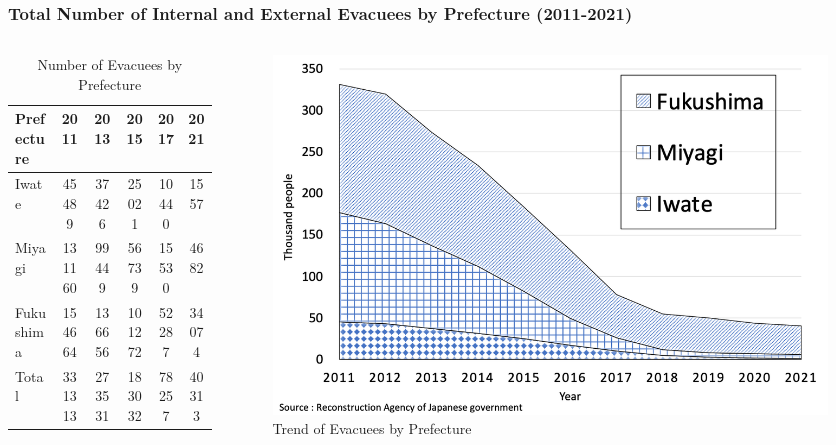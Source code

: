 \documentclass[serif, aspectratio=169]{beamer}
\begin{document}
\begin{frame}[label=evacuees_main]
\frametitle{Total Number of Internal and External Evacuees by Prefecture (2011-2021)}
    \vspace{-0.7cm}
    \begin{columns}[T, onlytextwidth]
        \begin{column}{0.5\textwidth}
            \begin{table}[ht]
                \scriptsize
                \setlength{\tabcolsep}{4pt}
                \renewcommand{\arraystretch}{1.0}
                \begin{tabular}{@{}lS[table-format=6.0]S[table-format=6.0]S[table-format=6.0]S[table-format=6.0]S[table-format=6.0]@{}}
                \toprule
                Prefecture & {2011} & {2013} & {2015} & {2017} & {2021} \\
                \midrule
                Iwate & 45489 & 37426 & 25021 & 10440 & 1557 \\
                Miyagi & 131160 & 99449 & 56739 & 15530 & 4682 \\
                Fukushima & 154664 & 136656 & 101272 & 52287 & 34074 \\
                \midrule
                Total & 331313 & 273531 & 183032 & 78257 & 40313 \\
                \bottomrule
                \end{tabular}
                \caption{Number of Evacuees by Prefecture}
                \label{tab:evacuees}
            \end{table}
        \end{column}
        
        \begin{column}{0.485\textwidth}
            \begin{figure}[ht]
                \centering
                \includegraphics[width=\textwidth]{evacuation2.png}
                \caption{Trend of Evacuees by Prefecture}
                \label{fig:evacuees_trend}
            \end{figure}
        \end{column}
    \end{columns}
    

\end{frame}
\end{document}
